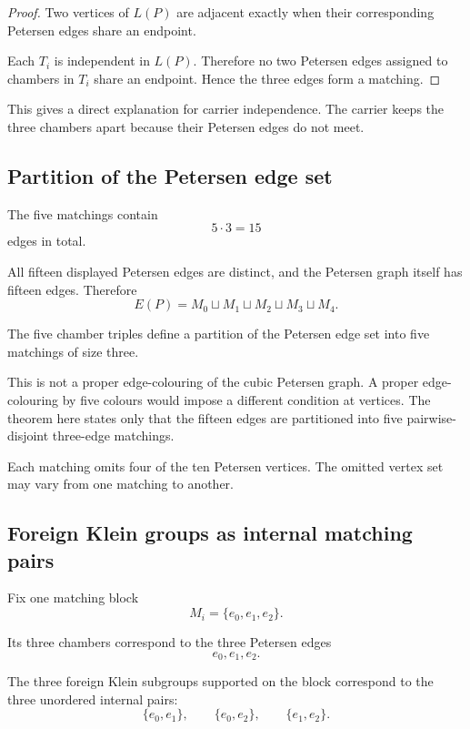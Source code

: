 \begin{proof}
Two vertices of \(L(P)\) are adjacent exactly when their corresponding
Petersen edges share an endpoint.

Each \(T_i\) is independent in \(L(P)\). Therefore no two Petersen
edges assigned to chambers in \(T_i\) share an endpoint. Hence the
three edges form a matching.
\end{proof}

This gives a direct explanation for carrier independence. The carrier
keeps the three chambers apart because their Petersen edges do not
meet.

\subsection{Partition of the Petersen edge set}

The five matchings contain
\[
5\cdot3=15
\]
edges in total.

All fifteen displayed Petersen edges are distinct, and the Petersen
graph itself has fifteen edges. Therefore
\[
E(P)
=
M_0\sqcup M_1\sqcup M_2\sqcup M_3\sqcup M_4.
\]

\begin{theorem}
The five chamber triples define a partition of the Petersen edge set
into five matchings of size three.
\end{theorem}

This is not a proper edge-colouring of the cubic Petersen graph. A
proper edge-colouring by five colours would impose a different
condition at vertices. The theorem here states only that the fifteen
edges are partitioned into five pairwise-disjoint three-edge
matchings.

Each matching omits four of the ten Petersen vertices. The omitted
vertex set may vary from one matching to another.

\subsection{Foreign Klein groups as internal matching pairs}

Fix one matching block
\[
M_i=\{e_0,e_1,e_2\}.
\]

Its three chambers correspond to the three Petersen edges
\[
e_0,e_1,e_2.
\]

The three foreign Klein subgroups supported on the block correspond to
the three unordered internal pairs:
\[
\{e_0,e_1\},
\qquad
\{e_0,e_2\},
\qquad
\{e_1,e_2\}.
\]

